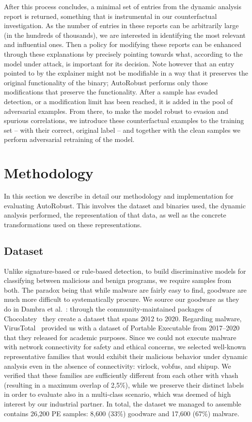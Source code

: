 After this process concludes, a minimal set of entries from the dynamic analysis report is returned, something that is instrumental in our counterfactual investigation.
As the number of entries in these reports can be arbitrarily large (in the hundreds of thousands), we are interested in identifying the most relevant and influential ones.
Then a policy for modifying these reports can be enhanced through these explanations by precisely pointing towards what, according to the model under attack, is important for its decision.
Note however that an entry pointed to by the explainer might not be modifiable in a way that it preserves the original functionality of the binary; AutoRobust performs only those modifications that preserve the functionality.
After a sample has evaded detection, or a modification limit has been reached, it is added in the pool of adversarial examples.
From there, to make the model robust to evasion and spurious correlations, we introduce these counterfactual examples to the training set -- with their correct, original label -- and together with the clean samples we perform adversarial retraining of the model.

\section{Methodology}
\label{dataset}

In this section we describe in detail our methodology and implementation for evaluating AutoRobust.
This involves the dataset and binaries used, the dynamic analysis performed, the representation of that data, as well as the concrete transformations used on these representations.

\subsection{Dataset}
Unlike signature-based or rule-based detection, to build discriminative models for classifying between malicious and benign programs, we require samples from both.
The paradox being that while malware are fairly easy to find, goodware are much more difficult to systematically procure.
We source our goodware as they do in Dambra et al.~\cite{dambra2023decoding}: through the community-maintained packages of Chocolatey~\cite{Chocolately} they create a dataset that spans 2012 to 2020.
Regarding malware, VirusTotal~\cite{VirusTotal} provided us with a dataset of Portable Executable from 2017--2020 that they released for academic purposes.
Since we could not execute malware with network connectivity for safety and ethical concerns, we selected well-known representative families that would exhibit their malicious behavior under dynamic analysis even in the absence of connectivity: virlock, vobfus, and shipup.
We verified that these families are sufficiently different from each other with vhash (resulting in a maximum overlap of 2,5\%), while we preserve their distinct labels in order to evaluate also in a multi-class scenario, which was deemed of high interest by our industrial partner. 
In total, the dataset we managed to assemble contains 26,200 PE samples: 8,600 (33\%) goodware and 17,600 (67\%) malware.

